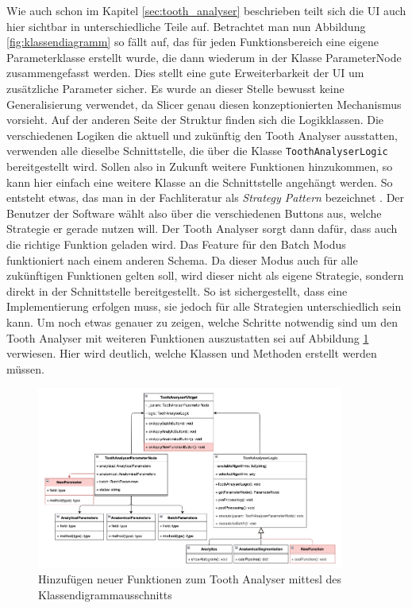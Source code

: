 Wie auch schon im Kapitel \ref{sec:tooth_analyser} beschrieben teilt sich die \ac{UI}
auch hier sichtbar in unterschiedliche Teile auf. Betrachtet man nun Abbildung \ref{fig:klassendiagramm}
so fällt auf, das für jeden Funktionsbereich eine eigene Parameterklasse
erstellt wurde, die dann wiederum in der Klasse ParameterNode zusammengefasst werden.
Dies stellt eine gute Erweiterbarkeit der \ac{UI} um zusätzliche Parameter sicher.
Es wurde an dieser Stelle bewusst keine Generalisierung verwendet, da Slicer genau
diesen konzeptionierten Mechanismus vorsieht. Auf der anderen Seite der Struktur
finden sich die Logikklassen. Die verschiedenen Logiken die aktuell und zukünftig
den Tooth Analyser ausstatten, verwenden alle dieselbe Schnittstelle, die über die
Klasse \texttt{ToothAnalyserLogic} bereitgestellt wird. Sollen also in Zukunft weitere
Funktionen hinzukommen, so kann hier einfach eine weitere Klasse an die
Schnittstelle angehängt werden. So entsteht etwas, das man in der Fachliteratur
als \textit{Strategy Pattern} bezeichnet \citep[vgl.][S. 99]{siebler2014}. Der Benutzer
der Software wählt also über die verschiedenen Buttons aus, welche Strategie er
gerade nutzen will. Der Tooth Analyser sorgt dann dafür, dass auch die richtige
Funktion geladen wird. Das Feature für den Batch Modus funktioniert nach einem anderen
Schema. Da dieser Modus auch für alle zukünftigen Funktionen gelten soll, wird dieser
nicht als eigene Strategie, sondern direkt in der Schnittstelle bereitgestellt. So
ist sichergestellt, dass eine Implementierung erfolgen muss, sie jedoch für alle
Strategien unterschiedlich sein kann. Um noch etwas genauer zu zeigen, welche Schritte
notwendig sind um den Tooth Analyser mit weiteren Funktionen auszustatten sei auf
Abbildung \ref{fig:klassendiagramm_new} verwiesen. Hier wird deutlich, welche Klassen
und Methoden erstellt werden müssen.

\begin{figure}[h]
	\centering
	\includegraphics[width=0.9\textwidth]{
		img/tooth_analyser_class_diagram_new.png
	}
	\caption{Hinzufügen neuer Funktionen zum Tooth Analyser mittesl des
	Klassendigrammausschnitts}
	\label{fig:klassendiagramm_new}
\end{figure}

